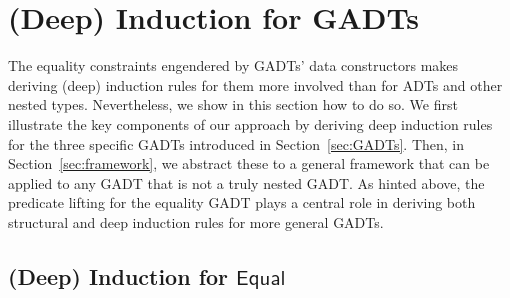 \documentclass[sigplan,screen]{acmart}
\begin{document}
\section{(Deep) Induction for GADTs}\label{sec:deep-ind-GADTs}

The equality constraints engendered by GADTs' data constructors makes
deriving (deep) induction rules for them more involved than for ADTs
and other nested types. Nevertheless, we show in this section how to
do so. We first illustrate the key components of our approach by
deriving deep induction rules for the three specific GADTs introduced
in Section~\ref{sec:GADTs}. Then, in Section~\ref{sec:framework}, we
abstract these to a general framework that can be applied to any GADT
that is not a truly nested GADT. As hinted above, the predicate
lifting for the equality GADT plays a central role in deriving both
structural and deep induction rules for more general GADTs.
 
\subsection{(Deep) Induction for $\mathsf{Equal}$}\label{sec:ind-equal}
\end{document}
